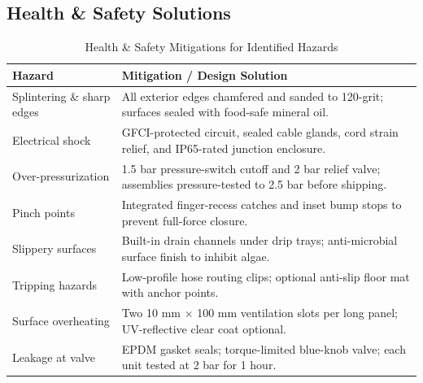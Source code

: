 \documentclass[12pt]{article}
\begin{document}
\subsection{Health \& Safety Solutions}
\begin{table}[h!]
    \centering
    \caption{Health \& Safety Mitigations for Identified Hazards}
    \label{tab:safety_mitigations}
    \begin{tabular}{l p{}}
    \hline
    \textbf{Hazard} & \textbf{Mitigation / Design Solution} \\
    \hline
    Splintering \& sharp edges  
      & All exterior edges chamfered and sanded to 120-grit; surfaces sealed with food-safe mineral oil. \\

    Electrical shock  
      & GFCI-protected circuit, sealed cable glands, cord strain relief, and IP65-rated junction enclosure. \\

    Over-pressurization  
      & 1.5 bar pressure-switch cutoff and 2 bar relief valve; assemblies pressure-tested to 2.5 bar before shipping. \\

    Pinch points  
      & Integrated finger-recess catches and inset bump stops to prevent full-force closure. \\

    Slippery surfaces  
      & Built-in drain channels under drip trays; anti-microbial surface finish to inhibit algae. \\

    Tripping hazards  
      & Low-profile hose routing clips; optional anti-slip floor mat with anchor points. \\

    Surface overheating  
      & Two 10 mm × 100 mm ventilation slots per long panel; UV-reflective clear coat optional. \\

    Leakage at valve  
      & EPDM gasket seals; torque-limited blue-knob valve; each unit tested at 2 bar for 1 hour. \\
    \hline
    \end{tabular}
\end{table}
\end{document}
